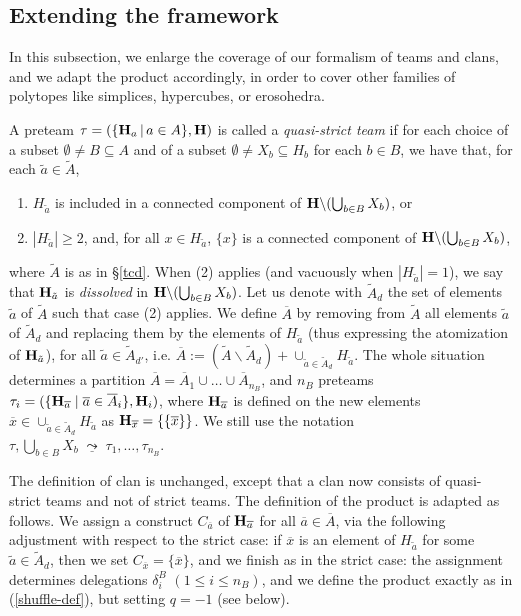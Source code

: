 \documentclass[11pt]{article}
\theoremstyle{definition}
\numberwithin{equation}{section}
\numberwithin{equation}{section}
\newcommand{\uline}[1]{\underline{#1}}
\newcommand{\inc}{\subseteq}
\newcommand{\set}[1]{\{#1\}}
\newcommand{\setc}[2]{\set{#1 \mid #2}}
\newcommand{\union}{\cup}		%
\newcommand{\Union}{\bigcup}		%
\newcommand{\restrH}[2]{\hyper{#1}\backslash #2}
\newcommand{\hyper}[1]{{\bf #1}}
\newcommand{\clandec}{\;\uline{\leadsto}\;}
\begin{document}
\subsection{Extending the framework}\label{quasi-strict-subsection} 

In this subsection, we enlarge the coverage of our formalism of teams and clans, and we adapt the   product accordingly, in order to cover other families of polytopes like simplices, hypercubes, or erosohedra. 

A preteam $\tau=(\{{\bf H}_a\,|\,a\in A\},{\bf H})$ is called a {\it quasi-strict team} if  for each choice of a   subset $\emptyset\neq B\inc A$ and of a subset $\emptyset\neq X_b\subseteq H_b$ for each $b\in B$, we have that, for each $\tilde{a}\in \tilde{A}$,  

\begin{enumerate}
\item[(1)] $H_{\tilde{a}}$ is included  in a connected component of $\restrH{H}{(\Union_{b\in B}X_b)}$, or
\item[(2)] $|H_{\tilde{a}}|\geq 2$, and, for all  $x\in H_{\tilde{a}}$, $\set{x}$ is a connected component of  $\restrH{H}{(\Union_{b\in B}X_b)}$,
\end{enumerate}
where $\tilde{A}$ is as in \S\ref{tcd}.  When (2) applies (and vacuously when $|H_{\tilde{a}}|=1$), we say that $\hyper{H}_{\tilde{a}}$ is {\em dissolved} in $\restrH{H}{(\Union_{b\in B}X_b)}$.
Let us denote with $\tilde{A}_d$ the set of elements $\tilde{a}$ of $\tilde{A}$ such that  case (2) applies.
We  define 
$\overline{A}$ by removing from $\tilde{A}$ all elements $\tilde{a}$ of $\tilde{A}_d$ and replacing them by the elements of $H_{\tilde{a}}$ (thus expressing the atomization of $\hyper{H}_{\tilde{a}}$), for all $\tilde{a}\in \tilde{A}_{d'}$, i.e. 
$\overline{A}:=(\tilde{A}\backslash \tilde{A}_d) + \union_{\tilde{a}\in \tilde{A}_d} H_{\tilde{a}}$.
The whole situation determines a partition $\overline{A}=\overline{A}_1\union\ldots\union \overline{A}_{n_B}$, and $n_B$ preteams $\tau_i =(\setc{\hyper{H}_{\overline{a}}}{\overline{a}\in \overline{A}_i},\hyper{H}_i)$, where $\hyper{H}_{\overline{a}}$ is defined on the new elements 
$\overline{x}\in  \union_{\tilde{a}\in \tilde{A}_d} H_{\tilde{a}}$
as $\hyper{H}_{\overline{x}}=\set{\set{\overline{x}}}$.
We still use the notation 
$\displaystyle{\tau,\Union_{b\in B}X_b\clandec \tau_1,\ldots,\tau_{n_B}.}$

The definition of clan is unchanged, except that a clan now consists of quasi-strict teams and not of strict teams.
The definition of the    product  is adapted as follows. We assign a  construct $C_{\overline{a}}$ of $\hyper{H}_{\overline{a}}$ for all $\overline{a}\in \overline{A}$, via the following adjustment with respect to the strict case: if $\overline{x}$ is an element of $H_{\tilde{a}}$ for some $\tilde{a}\in \tilde{A}_d$, then we set $C_{\overline{x}}=\set{\overline{x}}$, and we finish as in the strict case: the assignment determines delegations
$\delta_i^B$  $(1\leq i\leq n_B)$, and we define the product exactly as in (\ref{shuffle-def}), but setting $q=-1$ (see below).
\end{document}
